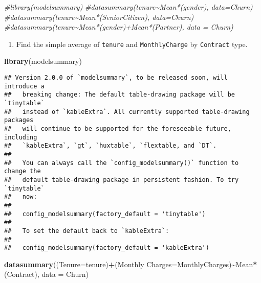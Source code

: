 \documentclass[
]{article}
\newenvironment{Shaded}{\begin{snugshade}}{\end{snugshade}}
\newcommand{\AttributeTok}[1]{\textcolor[rgb]{0.13,0.29,0.53}{#1}}
\newcommand{\CommentTok}[1]{\textcolor[rgb]{0.56,0.35,0.01}{\textit{#1}}}
\newcommand{\FunctionTok}[1]{\textcolor[rgb]{0.13,0.29,0.53}{\textbf{#1}}}
\newcommand{\NormalTok}[1]{#1}
\newcommand{\OtherTok}[1]{\textcolor[rgb]{0.56,0.35,0.01}{#1}}
\newcommand{\SpecialCharTok}[1]{\textcolor[rgb]{0.81,0.36,0.00}{\textbf{#1}}}
\newcommand{\StringTok}[1]{\textcolor[rgb]{0.31,0.60,0.02}{#1}}
\providecommand{\tightlist}{%
  \setlength{\itemsep}{0pt}\setlength{\parskip}{0pt}}
\begin{document}
\begin{Shaded}
\begin{Highlighting}[]
\CommentTok{\#library(modelsummary)}
\CommentTok{\#datasummary(tenure\textasciitilde{}Mean*(gender), data=Churn)}
\CommentTok{\#datasummary(tenure\textasciitilde{}Mean*(SeniorCitizen), data=Churn)}
\CommentTok{\#datasummary(tenure\textasciitilde{}Mean*(gender)+Mean*(Partner), data = Churn)}
\end{Highlighting}
\end{Shaded}

\begin{enumerate}
\def\labelenumi{\arabic{enumi})}
\setcounter{enumi}{2}
\tightlist
\item
  Find the simple average of \texttt{tenure} and \texttt{MonthlyCharge}
  by \texttt{Contract} type.
\end{enumerate}

\begin{Shaded}
\begin{Highlighting}[]
\FunctionTok{library}\NormalTok{(modelsummary)}
\end{Highlighting}
\end{Shaded}

\begin{verbatim}
## Version 2.0.0 of `modelsummary`, to be released soon, will introduce a
##   breaking change: The default table-drawing package will be `tinytable`
##   instead of `kableExtra`. All currently supported table-drawing packages
##   will continue to be supported for the foreseeable future, including
##   `kableExtra`, `gt`, `huxtable`, `flextable, and `DT`.
##   
##   You can always call the `config_modelsummary()` function to change the
##   default table-drawing package in persistent fashion. To try `tinytable`
##   now:
##   
##   config_modelsummary(factory_default = 'tinytable')
##   
##   To set the default back to `kableExtra`:
##   
##   config_modelsummary(factory_default = 'kableExtra')
\end{verbatim}

\begin{Shaded}
\begin{Highlighting}[]
\FunctionTok{datasummary}\NormalTok{((}\StringTok{\textasciigrave{}}\AttributeTok{Tenure}\StringTok{\textasciigrave{}}\OtherTok{=}\NormalTok{tenure)}\SpecialCharTok{+}\NormalTok{(}\StringTok{\textasciigrave{}}\AttributeTok{Monthly Charges}\StringTok{\textasciigrave{}}\OtherTok{=}\NormalTok{MonthlyCharges)}\SpecialCharTok{\textasciitilde{}}\NormalTok{Mean}\SpecialCharTok{*}\NormalTok{(Contract), }\AttributeTok{data =}\NormalTok{ Churn)}
\end{Highlighting}
\end{Shaded}
\end{document}
